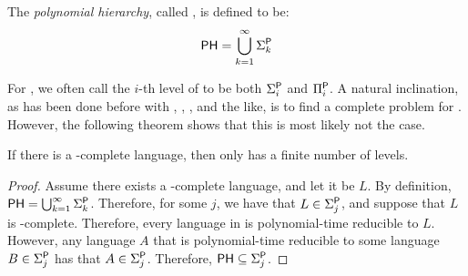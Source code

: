 \begin{definition}
The \emph{polynomial hierarchy}, called \PH, is defined to be:
\[
\text{\PH} = \bigcup_{k = 1}^{\infty} \Sigma_k^{\text{\P}}
\]
\end{definition}

For {\PH}, we often call the $i$-th level of {\PH} to be both $\Sigma_i^\text{\P}$ and $\Pi_i^\text{\P}$. A natural inclination, as has been done before with \NP, \PSPACE, \NL, and the like, is to find a complete problem for {\PH}. However, the following theorem shows that this is most likely not the case.

\begin{theorem}
If there is a \PH-complete language, then {\PH} only has a finite number of levels.
\end{theorem}

\begin{proof}
Assume there exists a \PH-complete language, and let it be $L$. By definition, $\text{\PH} = \bigcup_{k = 1}^{\infty} \Sigma_k^{\text{\P}}$. Therefore, for some $j$, we have that $L \in \Sigma_j^\P$, and suppose that $L$ is \PH-complete. Therefore, every language in {\PH} is polynomial-time reducible to $L$. However, any language $A$ that is polynomial-time reducible to some language $B \in \Sigma_j^\P$ has that $A \in \Sigma_j^\P$. Therefore, $\PH \subseteq \Sigma_j^\P$.
\end{proof}